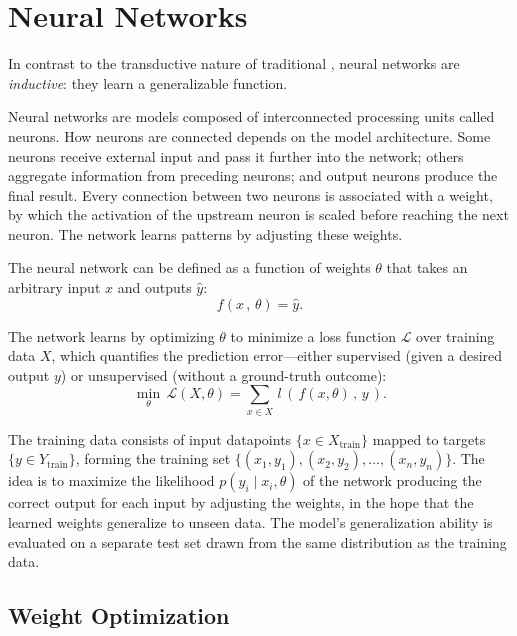 \section{Neural Networks}\label{sec:neural_networks}

In contrast to the transductive nature of traditional , neural networks
are \emph{inductive}: they learn a generalizable function.

Neural networks are models composed of interconnected processing units called neurons.
How neurons are connected depends on the model architecture. Some neurons receive
external input and pass it further into the network; others aggregate information from
preceding neurons; and output neurons produce the final result. Every connection
between two neurons is associated with a weight, by which the activation of the
upstream neuron is scaled before reaching the next neuron. The network learns patterns
by adjusting these weights.

The neural network can be defined as a function of weights $\theta$ that takes an
arbitrary input $x$ and outputs $\hat{y}$:
\[
f(x \,, \,\theta) = \hat{y}.
\]

The network learns by optimizing $\theta$ to minimize a loss function $\mathcal{L}$
over training data $X$, which quantifies the prediction error---either supervised
(given a desired output $y$) or unsupervised (without a ground-truth outcome):
\begin{equation}
    \min_{\theta} \, \mathcal{L}(X, \theta) = \sum_{x \in X} \, l \, (\,f(x, \theta)\,, \, y \,).
    \tag{supervised}
\end{equation}

The training data consists of input datapoints $\{x \in X_{\text{train}}\}$ mapped to
targets $\{y \in Y_{\text{train}}\}$, forming the training set
$\{(x_1,y_1),(x_2,y_2),\ldots,(x_n,y_n)\}$. The idea is to maximize the likelihood
$p(y_i \mid x_i,\theta)$ of the network producing the correct output for each input by
adjusting the weights, in the hope that the learned weights generalize to unseen data.
The model's generalization ability is evaluated on a separate test set drawn from the
same distribution as the training data.


\subsection{Weight Optimization}\label{sec:optimization}

